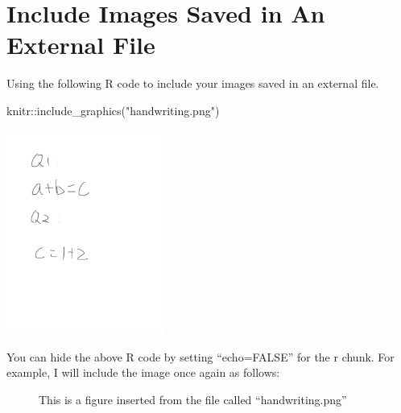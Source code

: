 \documentclass[
  letterpaper,
]{scrbook}
\newenvironment{Shaded}{\begin{snugshade}}{\end{snugshade}}
\newcommand{\FunctionTok}[1]{\textcolor[rgb]{0.28,0.35,0.67}{#1}}
\newcommand{\NormalTok}[1]{\textcolor[rgb]{0.00,0.23,0.31}{#1}}
\newcommand{\SpecialCharTok}[1]{\textcolor[rgb]{0.37,0.37,0.37}{#1}}
\newcommand{\StringTok}[1]{\textcolor[rgb]{0.13,0.47,0.30}{#1}}
\begin{document}
\section{Include Images Saved in An External
File}\label{include-images-saved-in-an-external-file}

Using the following R code to include your images saved in an external
file.

\begin{Shaded}
\begin{Highlighting}[]
\NormalTok{knitr}\SpecialCharTok{::}\FunctionTok{include\_graphics}\NormalTok{(}\StringTok{"handwriting.png"}\NormalTok{)}
\end{Highlighting}
\end{Shaded}

\includegraphics[width=2.04in,height=\textheight,keepaspectratio]{unit1-introR/handwriting.png}

You can hide the above R code by setting ``echo=FALSE'' for the r chunk.
For example, I will include the image once again as follows:

\begin{figure}


\caption{\label{fig-handwriting}This is a figure inserted from the file
called ``handwriting.png''}

\end{figure}%
\end{document}
